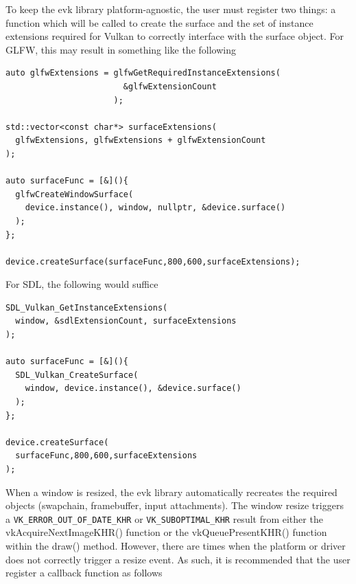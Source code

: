 \documentclass[12pt]{report}
\theoremstyle{definition}
\begin{document}
        To keep the evk library platform-agnostic, the user must register
        two things: a function which will be called to create the surface
        and the set of instance extensions required for Vulkan to correctly
        interface with the surface object. For GLFW, this may result in
        something like the following

        \begin{centering}
          \begin{Verbatim}[fontsize=\small]
auto glfwExtensions = glfwGetRequiredInstanceExtensions(
                        &glfwExtensionCount
                      );

std::vector<const char*> surfaceExtensions(
  glfwExtensions, glfwExtensions + glfwExtensionCount
);

auto surfaceFunc = [&](){
  glfwCreateWindowSurface(
    device.instance(), window, nullptr, &device.surface()
  );
};

device.createSurface(surfaceFunc,800,600,surfaceExtensions);
          \end{Verbatim}
        \end{centering}

        For SDL, the following would suffice

        \begin{centering}
          \begin{Verbatim}[fontsize=\small]
SDL_Vulkan_GetInstanceExtensions(
  window, &sdlExtensionCount, surfaceExtensions
);

auto surfaceFunc = [&](){
  SDL_Vulkan_CreateSurface(
    window, device.instance(), &device.surface()
  );
};

device.createSurface(
  surfaceFunc,800,600,surfaceExtensions
);
          \end{Verbatim}
        \end{centering}

          When a window is resized, the evk library automatically recreates the
          required objects (swapchain, framebuffer, input attachments). The
          window resize triggers a \verb|VK_ERROR_OUT_OF_DATE_KHR| or \verb|VK_SUBOPTIMAL_KHR|
          result from either the vkAcquireNextImageKHR() function or the
          vkQueuePresentKHR() function within the draw() method. However,
          there are times when the platform or driver does not correctly
          trigger a resize event. As such, it is recommended that the user register
          a callback function as follows
\end{document}
